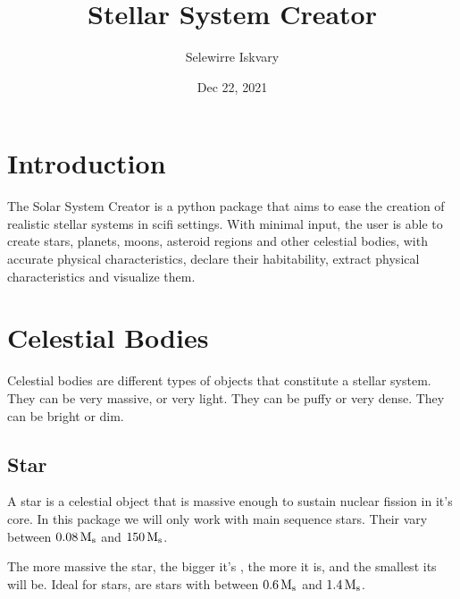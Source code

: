 \documentclass[letterpaper,10pt,english]{sphinxmanual}
\title{Stellar System Creator}
\date{Dec 22, 2021}
\author{Selewirre Iskvary}
\begin{document}
\pagestyle{empty}
\sphinxmaketitle
\pagestyle{plain}
\sphinxtableofcontents
\pagestyle{normal}
\label{\detokenize{index::doc}}



\chapter{Introduction}
\label{\detokenize{introduction:introduction}}\label{\detokenize{introduction::doc}}
\sphinxAtStartPar
The Solar System Creator is a python package that aims to ease the creation of realistic
stellar systems in sci\sphinxhyphen{}fi settings. With minimal input, the user is able to create stars, planets,
moons, asteroid regions and other celestial bodies, with accurate physical characteristics, declare their habitability,
extract physical characteristics and visualize them.


\chapter{Celestial Bodies}
\label{\detokenize{celestial_bodies/celestial_bodies:celestial-bodies}}\label{\detokenize{celestial_bodies/celestial_bodies::doc}}\label{\detokenize{celestial_bodies/celestial_bodies:id1}}
\sphinxAtStartPar
Celestial bodies are different types of objects that constitute a stellar system.
They can be very massive, or very light. They can be puffy or very dense.
They can be bright or dim.


\section{Star}
\label{\detokenize{celestial_bodies/star:star}}\label{\detokenize{celestial_bodies/star::doc}}\label{\detokenize{celestial_bodies/star:id1}}
\sphinxAtStartPar
A star is a celestial object that is massive enough to sustain nuclear fission in it’s core.
In this package we will only work with main sequence stars.
Their {\hyperref[\detokenize{quantities/material/mass:id1}]{}} vary between \(0.08 \, {\rm M_s}\) and \(150 \, {\rm M_s}\).

\sphinxAtStartPar
The more massive the star, the bigger it’s {\hyperref[\detokenize{quantities/geometric/radius:id1}]{}}, the more {\hyperref[\detokenize{quantities/surface/emission/luminosity:id1}]{}} it is,
and the smallest its {\hyperref[\detokenize{quantities/life/lifetime:id1}]{}} will be.
Ideal for {\hyperref[\detokenize{quantities/habitability/habitability:id1}]{}} stars, are stars with {\hyperref[\detokenize{quantities/material/mass:id1}]{}} between \(0.6 \, {\rm M_s}\)
and \(1.4 \, {\rm M_s}\).
\end{document}
